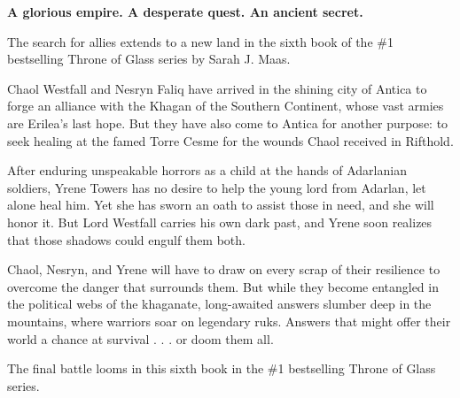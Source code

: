 
\newpage
\vspace*{\fill}
\begin{Center} %

    \hfill \break
    \textbf{A glorious empire. A desperate quest. An ancient secret.}

    \hfill \break
    The search for allies extends to a new land in the sixth book of the \#1 bestselling Throne of Glass series by Sarah J. Maas.          
    
    \hfill \break     
    Chaol Westfall and Nesryn Faliq have arrived in the shining city of Antica to forge an alliance with the Khagan of the Southern Continent, whose vast armies are Erilea's last hope. But they have also come to Antica for another purpose: to seek healing at the famed Torre Cesme for the wounds Chaol received in Rifthold.          
    
    \hfill \break     
    After enduring unspeakable horrors as a child at the hands of Adarlanian soldiers, Yrene Towers has no desire to help the young lord from Adarlan, let alone heal him. Yet she has sworn an oath to assist those in need, and she will honor it. But Lord Westfall carries his own dark past, and Yrene soon realizes that those shadows could engulf them both.          
    
    \hfill \break     
    Chaol, Nesryn, and Yrene will have to draw on every scrap of their resilience to overcome the danger that surrounds them. But while they become entangled in the political webs of the khaganate, long-awaited answers slumber deep in the mountains, where warriors soar on legendary ruks. Answers that might offer their world a chance at survival . . . or doom them all.          
    
    \hfill \break     
    The final battle looms in this sixth book in the \#1 bestselling Throne of Glass series.
\end{Center}
\vspace*{\fill}
